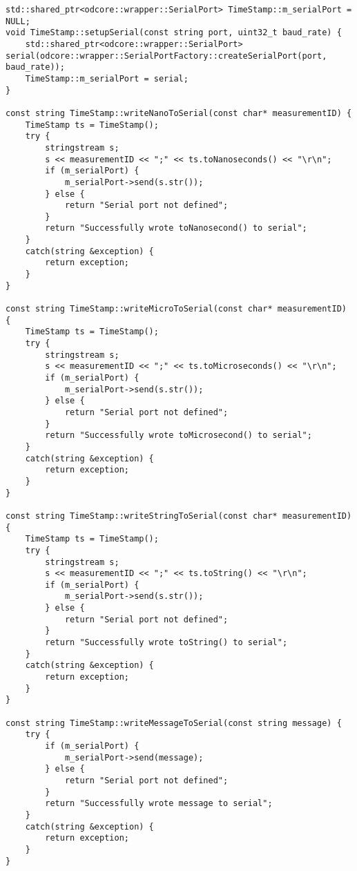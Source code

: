 \begin{lstlisting}[frame=single,label={code:serialtime}]
std::shared_ptr<odcore::wrapper::SerialPort> TimeStamp::m_serialPort = NULL;
void TimeStamp::setupSerial(const string port, uint32_t baud_rate) {
    std::shared_ptr<odcore::wrapper::SerialPort> serial(odcore::wrapper::SerialPortFactory::createSerialPort(port, baud_rate));
    TimeStamp::m_serialPort = serial;
}

const string TimeStamp::writeNanoToSerial(const char* measurementID) {
    TimeStamp ts = TimeStamp();
    try {
        stringstream s;
        s << measurementID << ";" << ts.toNanoseconds() << "\r\n";
        if (m_serialPort) {
            m_serialPort->send(s.str());
        } else {
            return "Serial port not defined";
        }
        return "Successfully wrote toNanosecond() to serial";
    }
    catch(string &exception) {
        return exception;
    }
}

const string TimeStamp::writeMicroToSerial(const char* measurementID) {
    TimeStamp ts = TimeStamp();
    try {
        stringstream s;
        s << measurementID << ";" << ts.toMicroseconds() << "\r\n";
        if (m_serialPort) {
            m_serialPort->send(s.str());
        } else {
            return "Serial port not defined";
        }
        return "Successfully wrote toMicrosecond() to serial";
    }
    catch(string &exception) {
        return exception;
    }
}

const string TimeStamp::writeStringToSerial(const char* measurementID) {
    TimeStamp ts = TimeStamp();
    try {
        stringstream s;
        s << measurementID << ";" << ts.toString() << "\r\n";
        if (m_serialPort) {
            m_serialPort->send(s.str());
        } else {
            return "Serial port not defined";
        }
        return "Successfully wrote toString() to serial";
    }
    catch(string &exception) {
        return exception;
    }
}

const string TimeStamp::writeMessageToSerial(const string message) {
    try {
        if (m_serialPort) {
            m_serialPort->send(message);
        } else {
            return "Serial port not defined";
        }
        return "Successfully wrote message to serial";
    }
    catch(string &exception) {
        return exception;
    }
}
\end{lstlisting}

